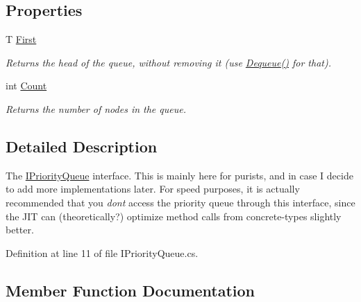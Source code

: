 \subsection*{Properties}
\begin{DoxyCompactItemize}
\item 
T \hyperlink{interface_priority___queue_1_1_i_priority_queue_a0faa318e892617bedc0f5f9f6c3e6e8b}{First}
\begin{DoxyCompactList}\small\item\em Returns the head of the queue, without removing it (use \hyperlink{interface_priority___queue_1_1_i_priority_queue_af5f9d687732841a773b3b0d332402b7b}{Dequeue()} for that). \end{DoxyCompactList}\item 
int \hyperlink{interface_priority___queue_1_1_i_priority_queue_a7cbcf139fcce73525521fee063bc4392}{Count}
\begin{DoxyCompactList}\small\item\em Returns the number of nodes in the queue. \end{DoxyCompactList}\end{DoxyCompactItemize}


\subsection{Detailed Description}
The \hyperlink{interface_priority___queue_1_1_i_priority_queue}{I\+Priority\+Queue} interface. This is mainly here for purists, and in case I decide to add more implementations later. For speed purposes, it is actually recommended that you {\itshape don\textquotesingle{}t} access the priority queue through this interface, since the J\+IT can (theoretically?) optimize method calls from concrete-\/types slightly better. 



Definition at line 11 of file I\+Priority\+Queue.\+cs.



\subsection{Member Function Documentation}
\mbox{\label{interface_priority___queue_1_1_i_priority_queue_a5939e029c023e34d3f70c350f6355823}} 
